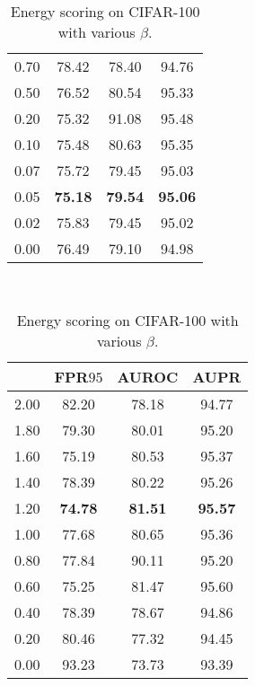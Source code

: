 \documentclass{article}
\begin{document}
\begin{table}[t]
{{\begin{tabular}{c|ccc}
0.70               & 78.42                       & 78.40                        & 94.76       \\
0.50               & 76.52                  & 80.54                  & 95.33 \\
0.20               & 75.32                  & 91.08                  & 95.48 \\
0.10               & 75.48                  & 80.63                  & 95.35 \\
0.07               & 75.72                  & 79.45                  & 95.03 \\
\cellcolor{greyC}0.05               & \cellcolor{greyC}\textbf{75.18}                  & \cellcolor{greyC}\textbf{79.54}                  & \cellcolor{greyC}\textbf{95.06} \\ 
0.02               & 75.83                  & 79.45                  & 95.02 \\
0.00               & 76.49                  & 79.10                  & 94.98 \\
\bottomrule[1.5pt]      
\end{tabular}
}
}~~
\parbox{.30\linewidth}{
\centering
\caption{Energy scoring on CIFAR-100 with various $\beta$.} \label{tab: 29}
\scriptsize
\vspace{5pt}
{
\begin{tabular}{c|ccc}
\toprule[1.5pt]
         & FPR$95$     & AUROC       & AUPR     \\
\midrule[0.6pt]
2.00               & 82.20                  & 78.18                  & 94.77 \\
1.80               & 79.30                  & 80.01                  & 95.20 \\
1.60               & 75.19                  & 80.53                  & 95.37 \\
1.40               & 78.39                  & 80.22                  & 95.26 \\
\cellcolor{greyC}1.20               & \cellcolor{greyC}\textbf{74.78}                  & \cellcolor{greyC}\textbf{81.51}                  & \cellcolor{greyC}\textbf{95.57} \\
1.00               & 77.68                  & 80.65                  & 95.36 \\
0.80               & 77.84                  & 90.11                  & 95.20 \\
0.60               & 75.25                  & 81.47                  & 95.60 \\
0.40               & 78.39                  & 78.67                  & 94.86 \\
0.20               & 80.46                  & 77.32                  & 94.45 \\
0.00               & 93.23                  & 73.73                  & 93.39 \\
\bottomrule[1.5pt]      
\end{tabular}
}
}
\end{table}
\end{document}
